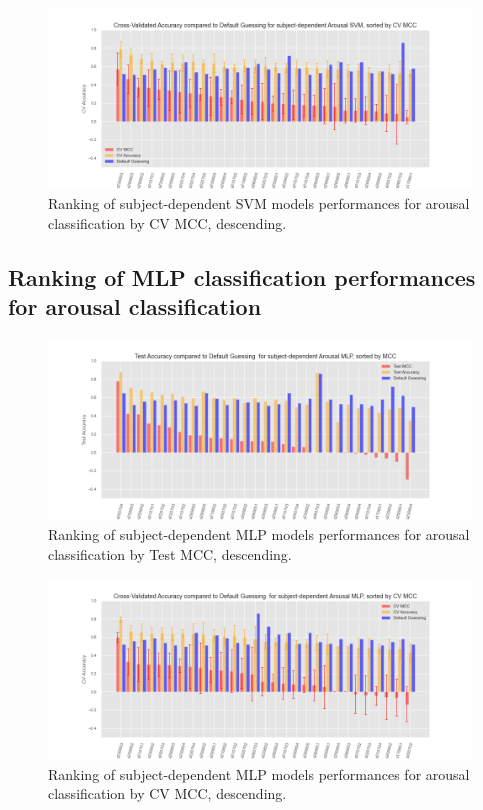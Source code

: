 \begin{figure}[!htb]
\includegraphics[width=16cm]{img/appendix/final_experiment/test_cv_acc_mcc_arousal_svm.png}
\centering
\caption{Ranking of subject-dependent SVM models performances for arousal classification by CV MCC, descending.}\label{fig:test_cv_acc_mcc_arousal_svm}
\end{figure}

\subsection{Ranking of MLP classification performances for arousal classification}
\label{sec:appendix_A4.2}

\begin{figure}[!htb]
\includegraphics[width=16cm]{img/appendix/final_experiment/test_acc_mcc_arousal_mlp.png}
\centering
\caption{Ranking of subject-dependent MLP models performances for arousal classification by Test MCC, descending.}\label{fig:test_acc_mcc_arousal_mlp}
\end{figure}

\begin{figure}[!htb]
\includegraphics[width=16cm]{img/appendix/final_experiment/test_cv_acc_mcc_arousal_mlp.png}
\centering
\caption{Ranking of subject-dependent MLP models performances for arousal classification by CV MCC, descending.}\label{fig:test_cv_acc_mcc_arousal_mlp}
\end{figure}

